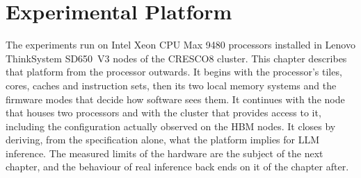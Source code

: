 \chapter{Experimental Platform}
\label{chap:experimental-platform}

The experiments run on Intel Xeon CPU Max 9480 processors installed in
Lenovo ThinkSystem SD650~V3 nodes of the CRESCO8 cluster.  This chapter
describes that platform from the processor outwards.  It begins with the
processor's tiles, cores, caches and instruction sets, then its two
local memory systems and the firmware modes that decide how software
sees them.  It continues with the node that houses two processors and
with the cluster that provides access to it, including the configuration
actually observed on the HBM nodes.  It closes by deriving, from the
specification alone, what the platform implies for LLM inference.  The
measured limits of the hardware are the subject of the next chapter, and
the behaviour of real inference back ends on it of the chapter after.


\FloatBarrier

\FloatBarrier

\FloatBarrier

\FloatBarrier


\cleardoublepage
